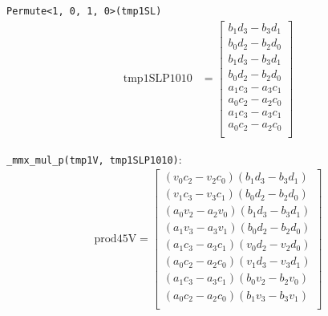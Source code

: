 \documentclass[fontsize = 10pt,DIV = 13]{scrartcl}
\newcommand{\pth}[1]{\left(#1\right)}
\begin{document}
\texttt{Permute<1, 0, 1, 0>(tmp1SL)}
\begin{align*}
\mathrm{tmp1SLP1010} 
&=
\begin{bmatrix}
	b_1d_3 - b_3d_1\\
	b_0d_2 - b_2d_0\\
	b_1d_3 - b_3d_1\\
	b_0d_2 - b_2d_0\\
	a_1c_3 - a_3c_1\\	
	a_0c_2 - a_2c_0\\
	a_1c_3 - a_3c_1\\	
	a_0c_2 - a_2c_0\\	
\end{bmatrix}
\end{align*}


\texttt{_mmx_mul_p(tmp1V, tmp1SLP1010)}:
\begin{align*}
\mathrm{prod45V} 
=
\begin{bmatrix}
\pth{v_0c_2 - v_2c_0}\pth{b_1d_3 - b_3d_1}\\
\pth{v_1c_3 - v_3c_1}\pth{b_0d_2 - b_2d_0}\\
\pth{a_0v_2 - a_2v_0}\pth{b_1d_3 - b_3d_1}\\
\pth{a_1v_3 - a_3v_1}\pth{b_0d_2 - b_2d_0}\\
\pth{a_1c_3 - a_3c_1}\pth{v_0d_2 - v_2d_0}\\
\pth{a_0c_2 - a_2c_0}\pth{v_1d_3 - v_3d_1}\\
\pth{a_1c_3 - a_3c_1}\pth{b_0v_2 - b_2v_0}\\
\pth{a_0c_2 - a_2c_0}\pth{b_1v_3 - b_3v_1}\\
\end{bmatrix}
\end{align*}
\end{document}

